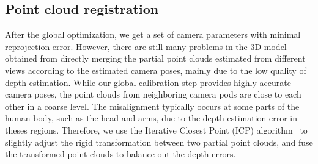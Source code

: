 
\subsection{Point cloud registration}
\label{sec:registration}


After the global optimization, we get a set of camera parameters with minimal reprojection error.
However, there are still many problems in the 3D model obtained from directly merging the partial point clouds estimated from different views according to the estimated camera poses, mainly due to the low quality of depth estimation.
%
%
While our global calibration step provides highly accurate camera poses, the point clouds from neighboring camera pods are close to each other in a coarse level.
The misalignment typically occurs at some parts of the human body, such as the head and arms, due to the depth estimation error in theses regions.
%
Therefore, we use the Iterative Closest Point (ICP) algorithm~\cite{Besl1992A} to slightly adjust the rigid transformation between two partial point clouds, and fuse the transformed point clouds to balance out the depth errors.
%

